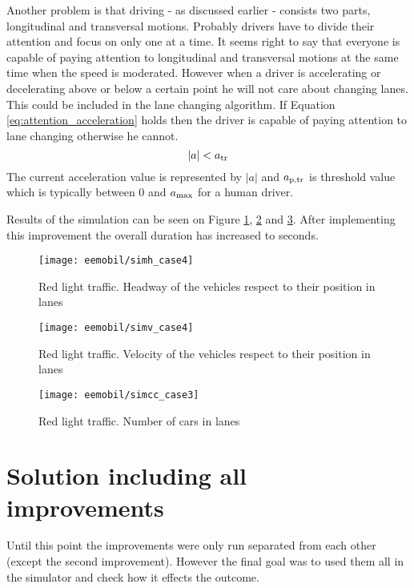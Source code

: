 		 Another problem is that driving - as discussed earlier - consists two parts, longitudinal and transversal motions. Probably drivers have to divide their attention and focus on only one at a time. It seems right to say that everyone is capable of paying attention to longitudinal and transversal motions at the same time when the speed is moderated. However when a driver is accelerating or decelerating above or below a certain point he will not care about changing lanes. This could be included in the lane changing algorithm. If Equation \ref{eq:attention_acceleration}  holds then the driver is capable of paying attention to lane changing otherwise he cannot.
		\begin{equation}
			|a|<a_{\rm tr}
			\label{eq:attention_acceleration}
		\end{equation}
		The current acceleration value is represented by $|a|$ and $a_{\rm p,tr}$ is threshold value which is typically between 0 and $a_{\rm max}$ for a human driver.
		
		Results of the simulation can be seen on Figure \ref{fig:red_light_situationh_impr3}, \ref{fig:red_light_situationv_impr3} and \ref{fig:red_light_situationcc_impr3}. After implementing this improvement the overall duration has increased to seconds.
		\begin{figure}[ht]
			\centering
			\texttt{[image: eemobil/simh\_case4]}
			\caption{Red light traffic. Headway of the vehicles respect to their position in lanes}
			\label{fig:red_light_situationh_impr3}
		\end{figure}
		\begin{figure}[ht]
			\centering
			\texttt{[image: eemobil/simv\_case4]}
			\caption{Red light traffic. Velocity of the vehicles respect to their position in lanes}
			\label{fig:red_light_situationv_impr3}
		\end{figure}
		\begin{figure}[ht]
			\centering
			\texttt{[image: eemobil/simcc\_case3]}
			\caption{Red light traffic. Number of cars in lanes }
			\label{fig:red_light_situationcc_impr3}
		\end{figure}
	\section{Solution including all improvements}
		Until this point the improvements were only run separated from each other (except the second improvement). However the final goal was to used them all in the simulator and check how it effects the outcome.

